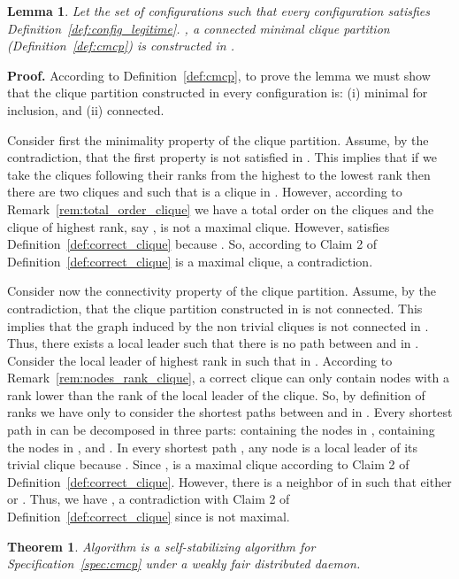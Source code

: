 \documentclass[11pt,letterpaper,onecolumn]{article}
\newtheorem{theorem}{Theorem}
\newtheorem{lemma}{Lemma}
\newenvironment{proof}{\noindent \begin{rm}{\textbf{Proof.} }}{\hspace*{\fill}\par\end{rm} \vspace{.3cm}}
\begin{document}
\begin{lemma}
\label{lem:sol_cmcp_config_legitime}
Let the set of configurations  such that every configuration  satisfies Definition~\ref{def:config_legitime}. , a connected minimal clique partition (Definition~\ref{def:cmcp}) is constructed in .
\end{lemma}

\begin{proof}
According to Definition~\ref{def:cmcp}, to prove the lemma we must show that the clique partition constructed in every configuration  is: (i) minimal for inclusion, and (ii) connected.

Consider first the minimality property of the clique partition. Assume, by the contradiction, that the first property is not satisfied in . This implies that if we take the cliques following their ranks from the highest to the lowest rank then there are two cliques  and  such that  is a clique in . However, according to Remark~\ref{rem:total_order_clique} we have a total order on the cliques and the clique of highest rank, say , is not a maximal clique. However,  satisfies Definition~\ref{def:correct_clique} because . So, according to Claim 2 of Definition~\ref{def:correct_clique}  is a maximal clique, a contradiction.

Consider now the connectivity property of the clique partition. Assume, by the contradiction, that the clique partition constructed in  is not connected. This implies that the graph  induced by the non trivial cliques is not connected in . Thus, there exists a local leader  such that there is no path  between  and  in . Consider the local leader  of highest rank in  such that  in . According to Remark~\ref{rem:nodes_rank_clique}, a correct clique can only contain nodes with a rank lower than the rank of the local leader of the clique. So, by definition of ranks we have only to consider the shortest paths between  and  in . Every shortest path  in  can be decomposed in three parts:  containing the nodes in ,  containing the nodes in , and . In every shortest path , any node  is a local leader of its trivial clique  because . Since ,  is a maximal clique according to Claim 2 of Definition~\ref{def:correct_clique}. However, there is a neighbor  of  in  such that either  or . Thus, we have , a contradiction with Claim 2 of Definition~\ref{def:correct_clique} since  is not maximal.
\end{proof}

\begin{theorem}
Algorithm  is a self-stabilizing algorithm for Specification~\ref{spec:cmcp} under a weakly fair distributed daemon.
\end{theorem}
\end{document}
